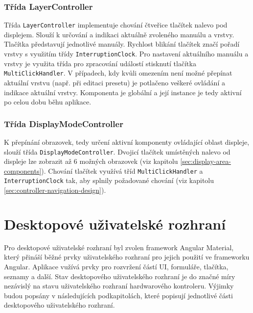 \documentclass[thesis=M,czech]{FITthesis}[2019/03/06]
\begin{document}
			\subsubsection{Třída LayerController}
				Třída \texttt{LayerController} implementuje chování čtveřice tlačítek nalevo pod displejem. Slouží k určování a indikaci aktuálně zvoleného manuálu a vrstvy.
				Tlačítka představují jednotlivé manuály. Rychlost blikání tlačítek značí pořadí vrstvy s využitím třídy \texttt{InterruptionClock}. Pro nastavení
				aktuálního manuálu a vrstvy je využita třída pro zpracování událostí stisknutí tlačítka \texttt{Multi\-Clic\-kHandler}.
				V případech, kdy kvůli omezením není možné přepínat aktuální vrstvu (např. při editaci presetu) je potlačeno veškeré ovládání a indikace aktuální vrstvy.
				Komponenta je globální a její instance je tedy aktivní po celou dobu běhu aplikace.
			
			\subsubsection{Třída DisplayModeController}
				K přepínání obrazovek, tedy určení aktivní komponenty ovládající oblast displeje, slouží třída \texttt{Display\-Mode\-Controller}. Dvojicí tlačítek
				umístěných nalevo od displeje lze zobrazit až 6 možných obrazovek (viz kapitolu \ref{sec:display-area-components}). Chování tlačítek využívá
				tříd \texttt{Multi\-Click\-Handler} a \texttt{Interruption\-Clock} tak, aby splnily požadované chování (viz kapitolu \ref{sec:controller-navigation-design}).
	
	\section{Desktopové uživatelské rozhraní}
		Pro desktopové uživatelské rozhraní byl zvolen framework Angular Material, který přináší běžné prvky
		uživatelského rozhraní pro jejich použití ve frameworku Angular. Aplikace vužívá prvky pro rozvržení
		částí UI, formuláře, tlačítka, seznamy a další. Stav desktopového uživatelského rozhraní je do značné míry
		nezávislý na stavu uživatelského rozhraní hardwarového kontroleru. Výjimky budou popsány v následujících podkapitolách, které 
		popisují jednotlivé části desktopového uživatelského rozhraní.
		
\end{document}
